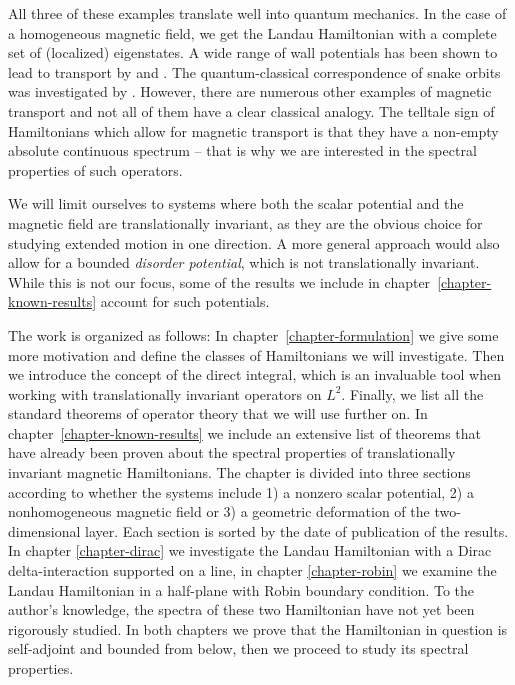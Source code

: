 All three of these examples translate well into quantum mechanics. In the case of a homogeneous magnetic field, we get the Landau Hamiltonian with a complete set of (localized) eigenstates. A wide range of wall potentials has been shown to lead to transport by \cite{Macris1999} and \cite{Frohlich2000}. The quantum-classical correspondence of snake orbits was investigated by \cite{Reijniers2000}. However, there are numerous other examples of magnetic transport and not all of them have a clear classical analogy. The telltale sign of Hamiltonians which allow for magnetic transport is that they have a non-empty absolute continuous spectrum – that is why we are interested in the spectral properties of such operators.

We will limit ourselves to systems where both the scalar potential and the magnetic field are translationally invariant, as they are the obvious choice for studying extended motion in one direction. A more general approach would also allow for a bounded \textit{disorder potential}, which is not translationally invariant. While this is not our focus, some of the results we include in chapter~\ref{chapter-known-results} account for such potentials.

The work is organized as follows: In chapter~\ref{chapter-formulation} we give some more motivation and define the classes of Hamiltonians we will investigate. Then we introduce the concept of the direct integral, which is an invaluable tool when working with translationally invariant operators on $L^2$. Finally, we list all the standard theorems of operator theory that we will use further on. In chapter~\ref{chapter-known-results} we include an extensive list of theorems that have already been proven about the spectral properties of translationally invariant magnetic Hamiltonians. The chapter is divided into three sections according to whether the systems include 1) a nonzero scalar potential, 2) a nonhomogeneous magnetic field or 3) a geometric deformation of the two-dimensional layer. Each section is sorted by the date of publication of the results. In chapter \ref{chapter-dirac} we investigate the Landau Hamiltonian with a Dirac delta-interaction supported on a line, in chapter \ref{chapter-robin} we examine the Landau Hamiltonian in a half-plane with Robin boundary condition. To the author's knowledge, the spectra of these two Hamiltonian have not yet been rigorously studied. In both chapters we prove that the Hamiltonian in question is self-adjoint and bounded from below, then we proceed to study its spectral properties.
